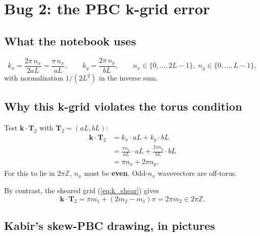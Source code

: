\documentclass[11pt,a4paper]{article}
\newcommand{\nn}{\nonumber \\}
\newcommand{\vk}{\mathbf{k}}
\newcommand{\vT}[1]{\mathbf{T}_{#1}}
\begin{document}
\section{Bug 2: the PBC k-grid error}\label{sec:pbc-bug}

\subsection{What the notebook uses}\label{ssec:dipanjan-kgrid}

\begin{buggybox}
\begin{equation}\label{eq:dipanjan_kgrid}
k_x = \frac{2\pi\, n_x}{2 a L} = \frac{\pi\, n_x}{a L},
\qquad
k_y = \frac{2\pi\, n_y}{b L},
\qquad
n_x \in \{0, \ldots, 2L-1\},\; n_y \in \{0, \ldots, L-1\},
\end{equation}
with normalization $1/(2 L^2)$ in the inverse sum.
\end{buggybox}

\subsection{Why this k-grid violates the torus condition}\label{ssec:kgrid-test}

Test $\vk \cdot \vT{2}$ with $\vT{2} = (aL, bL)$:
\begin{align}\label{eq:T2_test}
\vk \cdot \vT{2}
&= k_x \cdot aL + k_y \cdot bL \nn
&= \frac{\pi n_x}{a L}\cdot aL + \frac{2\pi n_y}{b L}\cdot bL \nn
&= \pi n_x + 2\pi n_y.
\end{align}
For this to lie in $2\pi\mathbb{Z}$, $n_x$ must be \textbf{even}.
Odd-$n_x$ wavevectors are off-torus.

By contrast, the sheared grid (\ref{eq:k_shear}) gives
\[
\vk \cdot \vT{2} = \pi m_1 + (2 m_2 - m_1)\pi = 2\pi m_2 \in 2\pi\mathbb{Z}.
\]

\subsection{Kabir's skew-PBC drawing, in pictures}\label{ssec:kabir-conn}
\end{document}
